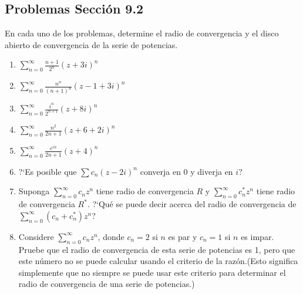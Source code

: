 \documentclass[12pt,letterpaper]{article}
\begin{document}
	\subsection* {Problemas Secci\'on 9.2}
\justify
En cada uno de los problemas, determine el radio de convergencia y el disco abierto de convergencia de la serie de potencias.
\begin{enumerate}
\item $\sum\limits_{n=0}^\infty\frac{n+1}{2^n}(z+3i)^n$
\item $\sum\limits_{n=0}^\infty\frac{n^n}{(n+1)^n}(z-1+3i)^n$
\item $\sum\limits_{n=0}^\infty\frac{i^n}{2^{n+1}}(z+8i)^n$
\item $\sum\limits_{n=0}^\infty\frac{n^2}{2n+1}(z+6+2i)^n$
\item $\sum\limits_{n=0}^\infty\frac{e^{in}}{2n+1}(z+4)^n$
\item ?`Es posible que $\sum c_{n}(z-2i)^n$ converja en 0 y diverja en $i$?
\item Suponga $\sum\limits_{n=0}^\infty c_{n}z^n$ tiene radio de convergencia $R$ y $\sum\limits_{n=0}^\infty c_{n}^*z^n$ tiene radio de convergencia $R^*$. ?`Qu\'e se puede decir acerca del radio de convergencia de $\sum\limits_{n=0}^\infty(c_{n}+c_{n}^*)z^n$?
\item Considere $\sum\limits_{n=0}^\infty c_{n}z^n$, donde $c_{n}=2$  si $n$ es par y $c_{n}=1$ si $n$ es impar. Pruebe que el radio de convergencia de esta serie de potencias es 1, pero que este n\'umero no se puede calcular usando el criterio de la raz\'on.(Esto significa simplemente que no siempre se puede usar este criterio para determinar el radio de convergencia de una serie de potencias.)
\end{enumerate}
\end{document}
